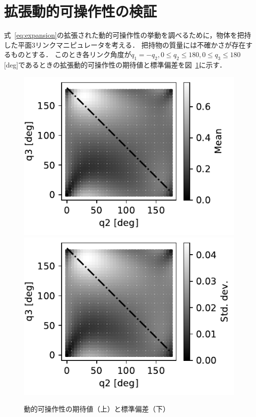 \documentclass[10pt,a4j,twocolumn]{ltjsarticle}
\begin{document}
\section{拡張動的可操作性の検証}

式~\eqref{eq:expansion}の拡張された動的可操作性の挙動を調べるために，物体を把持した平面3リンクマニピュレータを考える．
把持物の質量には不確かさが存在するものとする．
このとき各リンク角度が$q_{1} = -q_{2}, 0 \leq q_{2} \leq 180, 0 \leq q_{3} \leq 180$ [deg]であるときの拡張動的可操作性の期待値と標準偏差を図~\ref{fig:dyman_mean_std_2d}に示す．
\begin{figure}
  \centering
  \includegraphics[width=60truemm]{./dm_mean.pdf}
  \includegraphics[width=60truemm]{./dm_std.pdf}
  \caption{動的可操作性の期待値（上）と標準偏差（下）}
  \label{fig:dyman_mean_std_2d}

\end{figure}
\end{document}
